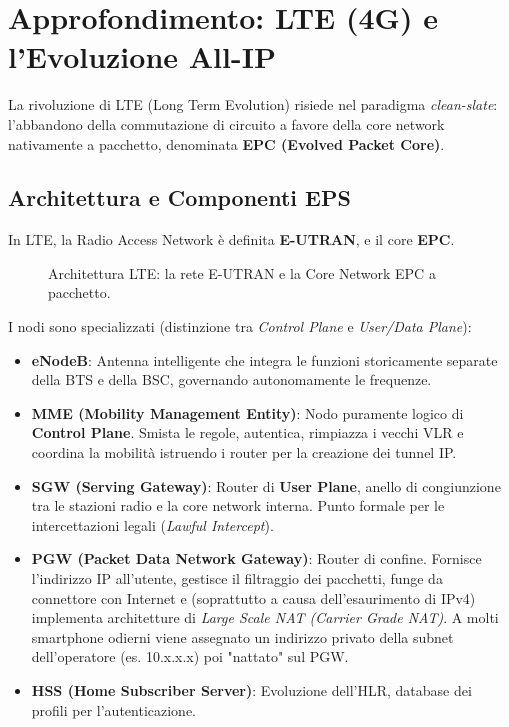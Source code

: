 \section{Approfondimento: LTE (4G) e l'Evoluzione All-IP}
La rivoluzione di LTE (Long Term Evolution) risiede nel paradigma \textit{clean-slate}: l'abbandono della commutazione di circuito a favore della core network nativamente a pacchetto, denominata \textbf{EPC (Evolved Packet Core)}.

\subsection{Architettura e Componenti EPS}
In LTE, la Radio Access Network è definita \textbf{E-UTRAN}, e il core \textbf{EPC}.

\begin{figure}[H]
    \centering
    \caption{Architettura LTE: la rete E-UTRAN e la Core Network EPC a pacchetto.}
    \label{fig:lte-arch}
\end{figure}

I nodi sono specializzati (distinzione tra \textit{Control Plane} e \textit{User/Data Plane}):
\begin{itemize}
    \item \textbf{eNodeB}: Antenna intelligente che integra le funzioni storicamente separate della BTS e della BSC, governando autonomamente le frequenze.
    \item \textbf{MME (Mobility Management Entity)}: Nodo puramente logico di \textbf{Control Plane}. Smista le regole, autentica, rimpiazza i vecchi VLR e coordina la mobilità istruendo i router per la creazione dei tunnel IP.
    \item \textbf{SGW (Serving Gateway)}: Router di \textbf{User Plane}, anello di congiunzione tra le stazioni radio e la core network interna. Punto formale per le intercettazioni legali (\textit{Lawful Intercept}).
    \item \textbf{PGW (Packet Data Network Gateway)}: Router di confine. Fornisce l'indirizzo IP all'utente, gestisce il filtraggio dei pacchetti, funge da connettore con Internet e (soprattutto a causa dell'esaurimento di IPv4) implementa architetture di \textit{Large Scale NAT (Carrier Grade NAT)}. A molti smartphone odierni viene assegnato un indirizzo privato della subnet dell'operatore (es. 10.x.x.x) poi "nattato" sul PGW.
    \item \textbf{HSS (Home Subscriber Server)}: Evoluzione dell'HLR, database dei profili per l'autenticazione.
\end{itemize}

